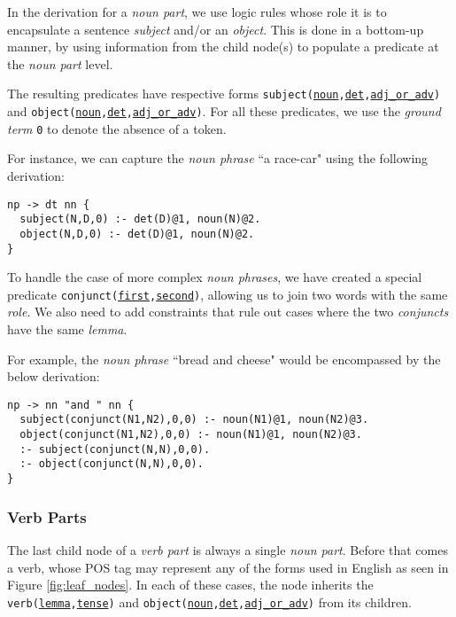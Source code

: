 In the derivation for a \textit{noun part}, we use logic rules whose role it is to encapsulate a sentence \textit{subject} and/or an \textit{object}. This is done in a bottom-up manner, by using information from the child node(s) to populate a predicate at the \textit{noun part} level.

The resulting predicates have respective forms \texttt{subject(\underline{noun},\underline{det},\underline{adj\_or\_adv})} and \texttt{object(\underline{noun},\underline{det},\underline{adj\_or\_adv})}. For all these predicates, we use the \textit{ground term} \texttt{0} to denote the absence of a token.

For instance, we can capture the \textit{noun phrase} ``a race-car" using the following derivation:

\begin{displayquote}
\begin{lstlisting}
np -> dt nn {
  subject(N,D,0) :- det(D)@1, noun(N)@2.
  object(N,D,0) :- det(D)@1, noun(N)@2.
}
\end{lstlisting}
\end{displayquote}

To handle the case of more complex \textit{noun phrases}, we have created a special predicate \texttt{conjunct(\underline{first},\underline{second})}, allowing us to join two words with the same \textit{role}. We also need to add constraints that rule out cases where the two \textit{conjuncts} have the same \textit{lemma}.

For example, the \textit{noun phrase} ``bread and cheese" would be encompassed by the below derivation:

\begin{displayquote}
\begin{lstlisting}
np -> nn "and " nn {
  subject(conjunct(N1,N2),0,0) :- noun(N1)@1, noun(N2)@3.
  object(conjunct(N1,N2),0,0) :- noun(N1)@1, noun(N2)@3.
  :- subject(conjunct(N,N),0,0).
  :- object(conjunct(N,N),0,0).
}
\end{lstlisting}
\end{displayquote}

\subsubsection{Verb Parts}

The last child node of a \textit{verb part} is always a single \textit{noun part}. Before that comes a verb, whose POS tag may represent any of the forms used in English as seen in Figure \ref{fig:leaf_nodes}. In each of these cases, the node inherits the \texttt{verb(\underline{lemma},\underline{tense})} and \texttt{object(\underline{noun},\underline{det},\underline{adj\_or\_adv})} from its children.

